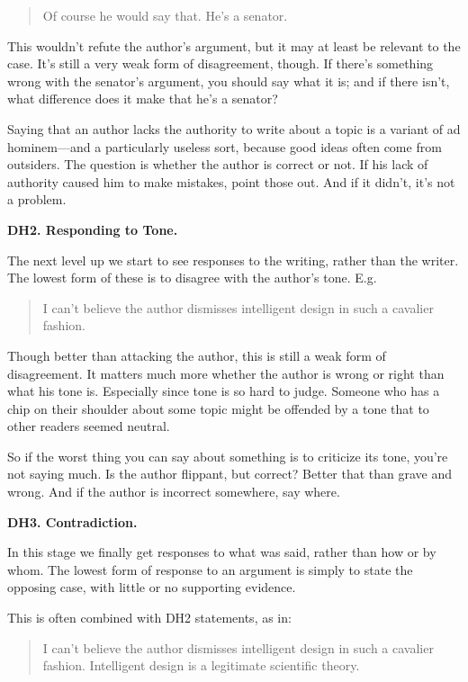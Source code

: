 \begin{quote}
Of course he would say that. He's a senator.
\end{quote}

This wouldn't refute the author's argument, but it may at least be
relevant to the case. It's still a very weak form of disagreement,
though. If there's something wrong with the senator's argument, you
should say what it is; and if there isn't, what difference does it make
that he's a senator?

Saying that an author lacks the authority to write about a topic is a
variant of ad hominem---and a particularly useless sort, because good
ideas often come from outsiders. The question is whether the author is
correct or not. If his lack of authority caused him to make mistakes,
point those out. And if it didn't, it's not a problem.

\textbf{DH2. Responding to Tone.}

The next level up we start to see responses to the writing, rather than
the writer. The lowest form of these is to disagree with the author's
tone. E.g.

\begin{quote}
I can't believe the author dismisses intelligent design in such a
cavalier fashion.
\end{quote}

Though better than attacking the author, this is still a weak form of
disagreement. It matters much more whether the author is wrong or right
than what his tone is. Especially since tone is so hard to judge.
Someone who has a chip on their shoulder about some topic might be
offended by a tone that to other readers seemed neutral.

So if the worst thing you can say about something is to criticize its
tone, you're not saying much. Is the author flippant, but correct?
Better that than grave and wrong. And if the author is incorrect
somewhere, say where.

\textbf{DH3. Contradiction.}

In this stage we finally get responses to what was said, rather than how
or by whom. The lowest form of response to an argument is simply to
state the opposing case, with little or no supporting evidence.

This is often combined with DH2 statements, as in:

\begin{quote}
I can't believe the author dismisses intelligent design in such a
cavalier fashion. Intelligent design is a legitimate scientific theory.
\end{quote}

